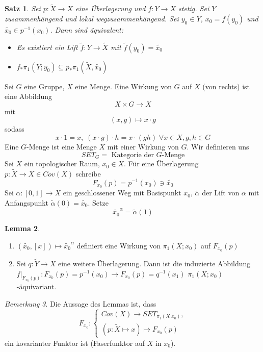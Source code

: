 \documentclass[a4paper, 12pt]{article}
\theoremstyle{plain}
\newtheorem{theorem}{Satz}[section] %
\theoremstyle{definition}
\theoremstyle{lemma}
\newtheorem{lemma}[theorem]{Lemma}
\theoremstyle{remark}
\newtheorem{remark}[theorem]{Bemerkung}
\theoremstyle{corollary}
\theoremstyle{example}
\begin{document}
	\begin{theorem}
		Sei $p: \tilde{X} \to X$ eine Überlagerung und $f:Y\to X$ stetig. Sei $Y$ zusammenhängend und lokal wegzusammenhängend. Sei $y_0 \in Y$, $x_0 = f(y_0)$ und $\tilde{x_0} \in p^{-1}(x_0)$. Dann sind äquivalent:
		\begin{itemize}
			\item Es existiert ein Lift $\tilde{f}: Y \to \tilde{X}$ mit $\tilde{f}(y_0) = \tilde{x_0}$
			\item $f_* \pi_1(Y;y_0) \subseteq p_*\pi_1(\tilde{X},\tilde{x_0})$
		\end{itemize}
	\end{theorem}
	Sei $G$ eine Gruppe, $X$ eine Menge. Eine Wirkung von $G$ auf $X$ (von rechts) ist eine Abbildung \[X\times G \to X\] mit \[(x,g) \mapsto x\cdot g\] sodass \[x\cdot 1 = x, \; (x \cdot g) \cdot h = x \cdot (gh) \; \forall x \in X, g,h \in G\]
	Eine $G$-Menge ist eine Menge $X$ mit einer Wirkung von $G$. Wir definieren uns \[SET_G = \text{ Kategorie der $G$-Menge}\]
	Sei $X$ ein topologischer Raum, $x_0 \in X$. Für eine Überlagerung $p: \tilde X \to X \in Cov(X)$ schreibe \[F_{x_0}(p) = p^{-1}(x_0) \ni \tilde{x_0}\]
	Sei $\alpha : [0,1] \to X$ ein geschlossener Weg mit Basispunkt $x_0$, $\tilde{\alpha}$ der Lift von $\alpha$ mit Anfangspunkt $\tilde{\alpha}(0) = \tilde{x_0}$. Setze \[\tilde{x_0}^\alpha = \tilde{\alpha}(1)\]
	\begin{lemma}
		\begin{enumerate}
			\item $(\tilde{x_0},[x]) \mapsto \tilde{x_0}^\alpha$ definiert eine Wirkung von $\pi_1(X;x_0)$ auf $F_{x_0}(p)$
			\item Sei $q:\tilde Y \to X$ eine weitere Überlagerung. Dann ist die induzierte Abbildung $f|_{F_{x_0}(p)}: F_{x_0}(p) = p^{-1}(x_0) \to F_{x_0}(p) = q^{-1}(x_1)$ $\pi_1(X;x_0)$-äquivariant.
 		\end{enumerate}
	\end{lemma} 
	\begin{remark}
		Die Aussage des Lemmas ist, dass \[F_{x_0}: \begin{cases}
			Cov(X) \to SET_{\pi_1(X\;x_0)},\\
			(p: \tilde X \mapsto x) \mapsto F_{x_0}(p)
		\end{cases}\] ein kovarianter Funktor ist (Faserfunktor auf $X$ in $x_0$). 
	\end{remark}
\end{document}
